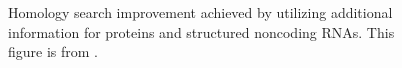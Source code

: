 \documentclass[custom,landscape,final,30pt,plainboxedsections]{sciposter-titleskipsmall}
\begin{document}
\begin{multicols}{3}
\setcounter{figure}{1}

\begin{footnotesize}
\begin{figure}
\caption{
Homology search improvement achieved by utilizing additional
information for proteins and structured noncoding RNAs. This figure is
from \cite{Nawrocki13b}.}
\label{fig:examples}
\end{figure}
\end{footnotesize}


\end{multicols}
\end{document}
